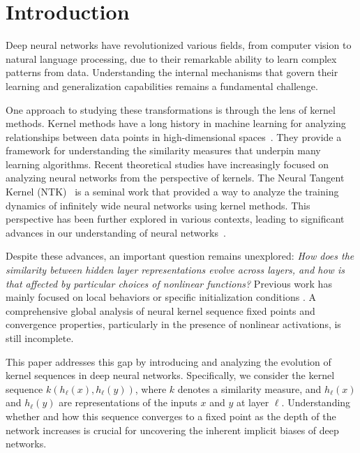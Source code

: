 \documentclass[twoside]{article}
\theoremstyle{definition}
\begin{document}
\section{Introduction}
Deep neural networks have revolutionized various fields, from computer vision to natural language processing, due to their remarkable ability to learn complex patterns from data. Understanding the internal mechanisms that govern their learning and generalization capabilities remains a fundamental challenge. 

One approach to studying these transformations is through the lens of kernel methods. Kernel methods have a long history in machine learning for analyzing relationships between data points in high-dimensional spaces~\citep{scholkopf2002learning, smola2004tutorial}. They provide a framework for understanding the similarity measures that underpin many learning algorithms. Recent theoretical studies have increasingly focused on analyzing neural networks from the perspective of kernels. The Neural Tangent Kernel (NTK)~\citep{jacot2018neural} is a seminal work that provided a way to analyze the training dynamics of infinitely wide neural networks using kernel methods. This perspective has been further explored in various contexts, leading to significant advances in our understanding of neural networks~\citep{lee2019wide, arora2019exact, yang2019scaling}.

Despite these advances, an important question remains unexplored: \emph{How does the similarity between hidden layer representations evolve across layers, and how is that affected by particular choices of nonlinear functions?} Previous work has mainly focused on local behaviors or specific initialization conditions \citep{saxe2013exact, schoenholz2016deep, pennington2017resurrecting}. A comprehensive global analysis of neural kernel sequence fixed points and convergence properties, particularly in the presence of nonlinear activations, is still incomplete.

This paper addresses this gap by introducing and analyzing the evolution of kernel sequences in deep neural networks. Specifically, we consider the kernel sequence $ k (h_\ell (x), h_\ell (y)) $, where $ k$ denotes a similarity measure, and $ h_\ell (x) $ and $ h_\ell (y) $ are representations of the inputs $ x$ and $ y$ at layer $\ell$. Understanding whether and how this sequence converges to a fixed point as the depth of the network increases is crucial for uncovering the inherent implicit biases of deep networks.
\end{document}
